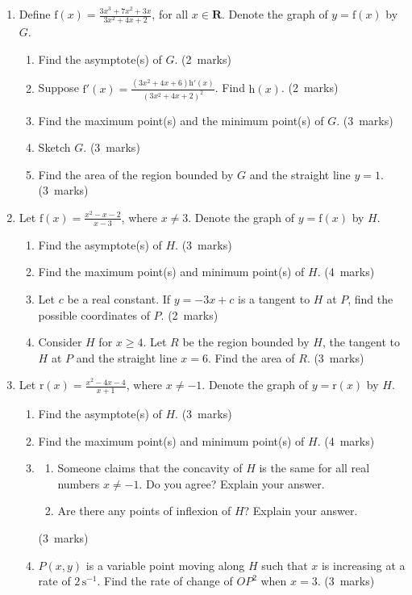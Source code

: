 \documentclass[12pt, a4paper]{article} %
\newcommand{\qmarks}[1]{\leavevmode\unskip\hspace*{\fill}\mbox{(#1 marks)}}
\begin{document}
\begin{enumerate}
    \item Define \(\displaystyle \mathrm{f}(x)=\frac{3x^3+7x^2+3x}{3x^2+4x+2}\), for all \(x\in \mathbf{R}\). Denote the graph of \(y=\mathrm{f}(x)\) by \(G\).
    \begin{enumerate}
        \item Find the asymptote(s) of \(G\). \qmarks{2}
        \item Suppose \(\displaystyle \mathrm{f}'(x)=\frac{(3x^2+4x+6)\mathrm{h}'(x)}{(3x^2+4x+2)^2}\).  Find \(\mathrm{h}(x)\). \qmarks{2}
        \item Find the maximum point(s) and the minimum point(s) of \(G\).  \qmarks{3}
        \item Sketch \(G\). \qmarks{3}
        \item Find the area of the region bounded by \(G\) and the straight line \(y=1\).   \qmarks{3}
    \end{enumerate}

    \item Let \(\displaystyle \mathrm{f}(x)=\frac{x^2-x-2}{x-3}\), where \(x\neq3\). Denote the graph of \(y=\mathrm{f}(x)\) by \(H\).
    \begin{enumerate}
        \item Find the asymptote(s) of \(H\). \qmarks{3}
        \item Find the maximum point(s) and minimum point(s) of \(H\). \qmarks{4}
        \item Let \(c\) be a real constant. If \(y=-3x+c\) is a tangent to \(H\) at \(P\), find the possible coordinates of \(P\). \qmarks{2}
        \item Consider \(H\) for \(x \geq4\). Let \(R\) be the region bounded by \(H\), the tangent to \(H\) at \(P\) and the straight line \(x=6\). Find the area of \(R\). \qmarks{3}
    \end{enumerate}

    \item Let \(\displaystyle \mathrm{r}(x)=\frac{x^2-4x-4}{x+1}\), where \(x \neq -1\). Denote the graph of \(y=\mathrm{r}(x)\) by \(H\).
    \begin{enumerate}
        \item Find the asymptote(s) of \(H\). \qmarks{3}
        \item Find the maximum point(s) and minimum point(s) of \(H\). \qmarks{4}
        \item \begin{enumerate}[label=(\roman*)]
            \item Someone claims that the concavity of \(H\) is the same for all real numbers \(x \neq -1\). Do you agree? Explain your answer.
            \item Are there any points of inflexion of \(H\)? Explain your answer.
        \end{enumerate}\qmarks{3}
        \item \(P(x,y)\) is a variable point moving along \(H\) such that \(x\) is increasing at a rate of \(2 \, \mathrm{s}^{-1}\). Find the rate of change of \(OP^2\) when \(x=3\). \qmarks{3}
    \end{enumerate}
\end{enumerate}
\newpage
\end{document}
